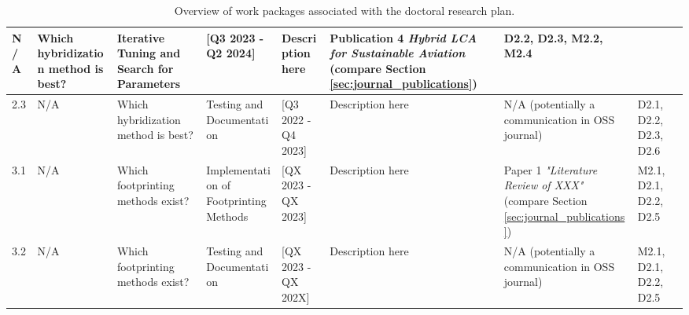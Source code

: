 \documentclass{article}
\begin{document}
\begin{landscape}
\begin{table}[H]
\begin{tabularx}{\linewidth}{|l|X|X|X|X|X|X|X|}
                N/A
                &
                Which hybridization method is best?
                &
                Iterative Tuning and Search for Parameters
                &
                [Q3 2023 - Q2 2024]
                &
                Description here
                &
                Publication 4 \textit{Hybrid LCA for Sustainable Aviation} (compare Section \ref{sec:journal_publications})
                &
                D2.2, D2.3, M2.2, M2.4
            \\
            \hline
                2.3
                &
                N/A
                &
                Which hybridization method is best?
                &
                Testing and Documentation
                &
                [Q3 2022 - Q4 2023]
                &
                Description here
                &
                N/A (potentially a communication in OSS journal)
                &
                D2.1, D2.2, D2.3, D2.6
            \\
            \hline
            \hline
                3.1
                &
                N/A
                &
                Which footprinting methods exist?
                &
                Implementation of Footprinting Methods
                &
                [QX 2023 - QX 2023]
                &
                Description here
                &
                Paper 1 \textit{"Literature Review of XXX"} (compare Section \ref{sec:journal_publications})
                &
                M2.1, D2.1, D2.2, D2.5
            \\
            \hline
                3.2
                &
                N/A
                &
                Which footprinting methods exist?
                &
                Testing and Documentation
                &
                [QX 2023 - QX 202X]
                &
                Description here
                &
                N/A (potentially a communication in OSS journal)
                &
                M2.1, D2.1, D2.2, D2.5
            \\
            \hline
        \end{tabularx}
        \caption{Overview of work packages associated with the doctoral research plan.}
        \label{tab:work_packages}
    \end{table}
    \end{landscape}
    
    
\end{document}
